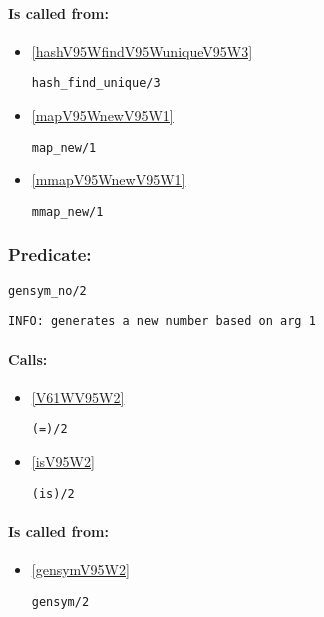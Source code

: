 \paragraph{Is called from:} 
\begin{itemize}
\item \ref{hashV95WfindV95WuniqueV95W3} 
\begin{verbatim}
hash_find_unique/3
\end{verbatim}

\item \ref{mapV95WnewV95W1} 
\begin{verbatim}
map_new/1
\end{verbatim}

\item \ref{mmapV95WnewV95W1} 
\begin{verbatim}
mmap_new/1
\end{verbatim}

\end{itemize}

\subsubsection{Predicate:} \label{gensymV95WnoV95W2}

\begin{verbatim}
gensym_no/2
\end{verbatim}

{\small \begin{verbatim}
INFO: generates a new number based on arg 1

\end{verbatim}}
\paragraph{Calls:} 
\begin{itemize}
\item \ref{V61WV95W2} 
\begin{verbatim}
(=)/2
\end{verbatim}

\item \ref{isV95W2} 
\begin{verbatim}
(is)/2
\end{verbatim}

\end{itemize}
\paragraph{Is called from:} 
\begin{itemize}
\item \ref{gensymV95W2} 
\begin{verbatim}
gensym/2
\end{verbatim}

\end{itemize}

